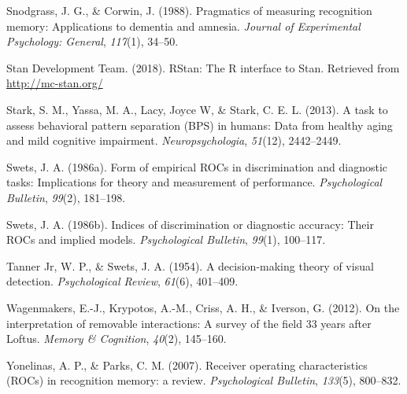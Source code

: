 \documentclass[
  english,
  ,man,floatsintext]{apa6}
\begin{document}
\leavevmode\hypertarget{ref-SnodgrassAndCorwin1988}{}%
Snodgrass, J. G., \& Corwin, J. (1988). Pragmatics of measuring recognition memory: Applications to dementia and amnesia. \emph{Journal of Experimental Psychology: General}, \emph{117}(1), 34--50.

\leavevmode\hypertarget{ref-rstan}{}%
Stan Development Team. (2018). RStan: The R interface to Stan. Retrieved from \url{http://mc-stan.org/}

\leavevmode\hypertarget{ref-StarkEtAl2013}{}%
Stark, S. M., Yassa, M. A., Lacy, Joyce W, \& Stark, C. E. L. (2013). A task to assess behavioral pattern separation (BPS) in humans: Data from healthy aging and mild cognitive impairment. \emph{Neuropsychologia}, \emph{51}(12), 2442--2449.

\leavevmode\hypertarget{ref-Swets1986b}{}%
Swets, J. A. (1986a). Form of empirical ROCs in discrimination and diagnostic tasks: Implications for theory and measurement of performance. \emph{Psychological Bulletin}, \emph{99}(2), 181--198.

\leavevmode\hypertarget{ref-Swets1986a}{}%
Swets, J. A. (1986b). Indices of discrimination or diagnostic accuracy: Their ROCs and implied models. \emph{Psychological Bulletin}, \emph{99}(1), 100--117.

\leavevmode\hypertarget{ref-TannerAndSwets1954}{}%
Tanner Jr, W. P., \& Swets, J. A. (1954). A decision-making theory of visual detection. \emph{Psychological Review}, \emph{61}(6), 401--409.

\leavevmode\hypertarget{ref-WagenmakersEtAl2012}{}%
Wagenmakers, E.-J., Krypotos, A.-M., Criss, A. H., \& Iverson, G. (2012). On the interpretation of removable interactions: A survey of the field 33 years after Loftus. \emph{Memory \& Cognition}, \emph{40}(2), 145--160.

\leavevmode\hypertarget{ref-YonelinasAndParks2007}{}%
Yonelinas, A. P., \& Parks, C. M. (2007). Receiver operating characteristics (ROCs) in recognition memory: a review. \emph{Psychological Bulletin}, \emph{133}(5), 800--832.
\end{document}
